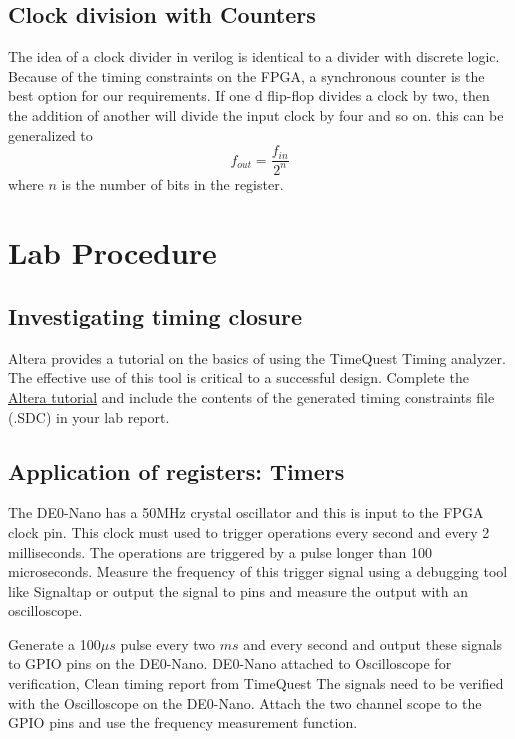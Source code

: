   \subsection{Clock division with Counters}
    The idea of a clock divider in verilog is identical to a divider with discrete logic. Because of the timing constraints on the FPGA, a synchronous counter is the best option for our requirements. If one d flip-flop divides a clock by two, then the addition of another will divide the input clock by four and so on. this can be generalized to $$f_{out}=\frac{f_{in}}{2^n}$$ where $n$ is the number of bits in the register.
    
\section{Lab Procedure}
    \subsection{Investigating timing closure}
     Altera provides a tutorial on the basics of using the TimeQuest Timing analyzer. The effective use of this tool is critical to a successful design. Complete the \href{ftp://ftp.altera.com/up/pub/Altera_Material/13.0/Tutorials/Timequest.pdf}{Altera tutorial} and include the contents of the generated timing constraints file (.SDC) in your lab report.

    \subsection{Application of registers: Timers}
    The DE0-Nano has a 50MHz crystal oscillator and this is input to the FPGA clock pin.  This clock must used to trigger operations every second and every 2 milliseconds. The operations are triggered by a pulse longer than 100 microseconds. Measure the frequency  of this trigger signal using a debugging tool like Signaltap or output the signal to pins and measure the output with an oscilloscope.
     
      {Generate a 100$\mu s$ pulse every two $ms$ and every second and output these signals to GPIO pins on the DE0-Nano.}
      {DE0-Nano attached to Oscilloscope for verification, Clean timing report from TimeQuest}
      {The signals need to be verified with the Oscilloscope on the DE0-Nano. Attach the two channel scope to the GPIO pins and use the frequency measurement function.}


